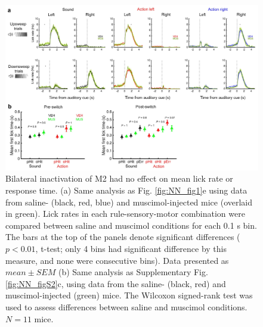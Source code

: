 \begin{figure}[htbp]

\begin{center}
\includegraphics[width=\textwidth]{Figures/Chapter3/NN_figS5.jpg} 
\end{center}

\caption[M2 inactivation did not affect mean lick rate or response time]
{Bilateral inactivation of M2 had no effect on mean lick rate or response time.
(a) Same analysis as Fig. \ref{fig:NN_fig1}e using data from saline- (black, red, blue) and muscimol-injected mice (overlaid in green). Lick rates in each rule-sensory-motor combination were compared between saline and muscimol conditions for each 0.1 s bin. The bars at the top of the panels denote significant differences ($p<0.01$, t-test; only 4 bins had significant difference by this measure, and none were consecutive bins). Data presented as $\mathit{mean}\pm\mathit{SEM}$ (b) Same analysis as Supplementary Fig. \ref{fig:NN_figS2}c, using data from the saline- (black, red) and muscimol-injected (green) mice. The Wilcoxon signed-rank test was used to assess differences between saline and muscimol conditions. $N = 11$ mice.}

\label{fig:NN_figS5}
\end{figure}